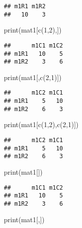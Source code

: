 \documentclass[
]{article}
\newenvironment{Shaded}{\begin{snugshade}}{\end{snugshade}}
\newcommand{\DecValTok}[1]{\textcolor[rgb]{0.00,0.00,0.81}{#1}}
\newcommand{\FunctionTok}[1]{\textcolor[rgb]{0.00,0.00,0.00}{#1}}
\newcommand{\NormalTok}[1]{#1}
\begin{document}
\begin{verbatim}
## m1R1 m1R2 
##   10    3
\end{verbatim}

\begin{Shaded}
\begin{Highlighting}[]
\FunctionTok{print}\NormalTok{(mat1[}\FunctionTok{c}\NormalTok{(}\DecValTok{1}\NormalTok{,}\DecValTok{2}\NormalTok{),])}
\end{Highlighting}
\end{Shaded}

\begin{verbatim}
##      m1C1 m1C2
## m1R1   10    5
## m1R2    3    6
\end{verbatim}

\begin{Shaded}
\begin{Highlighting}[]
\FunctionTok{print}\NormalTok{(mat1[,}\FunctionTok{c}\NormalTok{(}\DecValTok{2}\NormalTok{,}\DecValTok{1}\NormalTok{)])}
\end{Highlighting}
\end{Shaded}

\begin{verbatim}
##      m1C2 m1C1
## m1R1    5   10
## m1R2    6    3
\end{verbatim}

\begin{Shaded}
\begin{Highlighting}[]
\FunctionTok{print}\NormalTok{(mat1[}\FunctionTok{c}\NormalTok{(}\DecValTok{1}\NormalTok{,}\DecValTok{2}\NormalTok{),}\FunctionTok{c}\NormalTok{(}\DecValTok{2}\NormalTok{,}\DecValTok{1}\NormalTok{)])}
\end{Highlighting}
\end{Shaded}

\begin{verbatim}
##      m1C2 m1C1
## m1R1    5   10
## m1R2    6    3
\end{verbatim}

\begin{Shaded}
\begin{Highlighting}[]
\FunctionTok{print}\NormalTok{(mat1[])}
\end{Highlighting}
\end{Shaded}

\begin{verbatim}
##      m1C1 m1C2
## m1R1   10    5
## m1R2    3    6
\end{verbatim}

\begin{Shaded}
\begin{Highlighting}[]
\FunctionTok{print}\NormalTok{(mat1[,])}
\end{Highlighting}
\end{Shaded}
\end{document}

